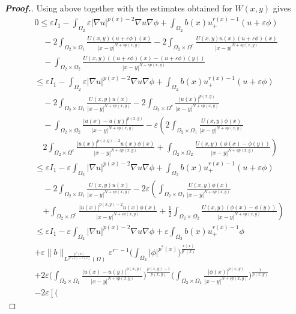 \documentclass[10pt,a4paper]{amsart}
\newcommand{\na} {\nabla}
\newcommand{\om} {\Omega}
\newcommand{\ve}{\varepsilon}
\begin{document}
\begin{proof}[\bf Proof.]
\noindent Using above together with the estimates obtained for $W(x,y)$ gives 
    \begin{align*}
&0  \le \ve I_1-
\int_{\om_2}\ve|\na u|^{p(x)-2}\na u\na \phi+
\int_{\om_2} b(x)u_+^{r(x)-1}(u+\ve\phi) \\
&\quad -2
\int_{\om_2\times \om_1} 
\frac{U(x,y)(u+\ve\phi)(x)}{|x-y|^{N+sp(x,y)}} -2
\int_{\om_2\times \om^c} 
\frac{U(x,y)u(x)(u+\ve\phi)(x)}{|x-y|^{N+sp(x,y)}}\\
& \quad  -
\int_{\om_2\times \om_2} 
\frac{U(x,y)((u+\ve\phi)(x)-(u+\ve\phi)(y))}
{|x-y|^{N+sp(x,y)}}\\
    & \le  \ve I_1-
\int_{\om_2}\ve|\na u|^{p(x)-2}\na u\na \phi+
\int_{\om_2} b(x)u_+^{r(x)-1}(u+\ve\phi) \\
& \quad -2 \int_{\om_2\times \om_1} 
\frac{U(x,y)u(x)}{|x-y|^{N+sp(x,y)}} -2
\int_{\om_2\times \om^c} 
\frac{|u(x)|^{p(x,y)}}{|x-y|^{N+sp(x,y)}} \\
& \quad  - \int_{\om_2\times \om_2} 
\frac{|u(x)-u(y)|^{p(x,y)}}{|x-y|^{N+sp(x,y)}}-\ve
\left (2
\int_{\om_2\times \om_1} 
\frac{U(x,y)\phi(x)}{|x-y|^{N+sp(x,y)}}\right.\\
    & \quad \left. 2
\int_{\om_2\times \om^c} 
\frac{|u(x)|^{p(x,y)-2}u(x)\phi(x)}{|x-y|^{N+sp(x,y)}}+
\int_{\om_2\times \om_2} 
\frac{U(x,y)(\phi(x)-\phi(y))}{|x-y|^{N+sp(x,y)}}
\right )\\
    & \le  \ve I_1-\ve
\int_{\om_2}|\na u|^{p(x)-2}\na u\na \phi+
\int_{\om_2} b(x)u_+^{r(x)-1}(u+\ve\phi)\\
& \quad  -2
\int_{\om_2\times \om_1} 
\frac{U(x,y)u(x)}{|x-y|^{N+sp(x,y)}}
-2\ve
\left (
\int_{\om_2\times \om_1} 
\frac{U(x,y)\phi(x)}{|x-y|^{N+sp(x,y)}} \right. \\
& \quad \left. +
\int_{\om_2\times \om^c} 
\frac{|u(x)|^{p(x,y)-2}u(x)\phi(x)}
{|x-y|^{N+sp(x,y)}} + \frac{1}{2}
\int_{\om_2\times \om_2} 
\frac{U(x,y)(\phi(x)-\phi(y))}
{|x-y|^{N+sp(x,y)}}
\right )\\
    & \le   \ve I_1-\ve
\int_{\om_2}|\na u|^{p(x)-2}\na u\na \phi+\ve
\int_{\om_2} b(x)u_+^{r(x)-1}\phi \\
& +\ve\|b\|_{L^{
\frac{p^*(x)}{p^*(x)-r(x)}}(\om)}\ve^{r^--1}\Big (
\int_{\om_2}|\phi|^{p^*(x)}\Big )^{
\frac{r(x)}{p^*(x)}}\\
    &+2\ve\Big (
\int_{\om_2\times \om_1} 
\frac{|u(x)-u(y)|^{p(x,y)}}{|x-y|^{N+sp(x,y)}}\Big )^{
\frac{p(x,y)-1}{p(x,y)}}\Big (
\int_{\om_2\times \om_1} 
\frac{|\phi(x)|^{p(x,y)}}{|x-y|^{N+sp(x,y)}}\Big )^{
\frac{1}{p(x,y)}}\\
    &-2\ve\left[\Big (

\end{align*}
\end{proof}
\end{document}
